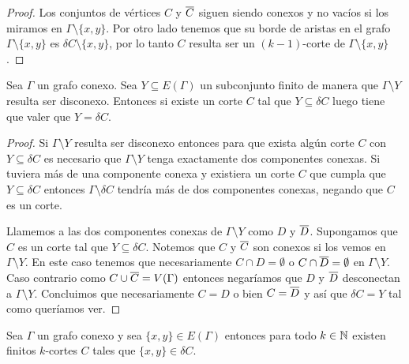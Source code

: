 \documentclass[tesis.tex]{subfiles}
\begin{document}
\begin{proof}
	Los conjuntos de vértices $C$ y $\overline C$ siguen siendo conexos y no vacíos si los miramos en $\Gamma \setminus \{ x,y \}$.
	Por otro lado tenemos que su borde de aristas en el grafo $\Gamma \setminus \{x,y\}$ es $\delta C \setminus \{x,y\}$, por lo tanto $C$ resulta ser un $(k-1)$-corte de $\Gamma \setminus \{x,y\}$.
\end{proof}

\begin{lema}\label{lema_corte_disconexo_vertices}
	Sea $\Gamma$ un grafo conexo.
	Sea $Y \subseteq E(\Gamma)$ un subconjunto finito de manera que $\Gamma \setminus Y$ resulta ser disconexo.
	Entonces si existe un corte $C$ tal que $Y \subseteq \delta C$ luego tiene que valer que $Y = \delta C$.
\end{lema}

\begin{proof}
	Si $\Gamma \setminus Y$ resulta ser disconexo entonces para que exista algún corte $C$ con $Y \subseteq \delta C$ es necesario que $\Gamma \setminus Y$ tenga exactamente dos componentes conexas.
	Si tuviera más de una componente conexa y existiera un corte $C$ que cumpla que $Y \subseteq \delta C$ entonces $\Gamma \setminus \delta C$ tendría más de dos componentes conexas, negando que $C$ es un corte.	
	
	Llamemos a las dos componentes conexas de $\Gamma \setminus Y$ como $D$ y  $\overline D$.
	Supongamos que $C$ es un corte tal que $Y \subseteq \delta C$. 
	Notemos que $C$ y $\overline C$ son conexos si los vemos en $\Gamma \setminus Y$.
	En este caso tenemos que necesariamente $C \cap  D = \emptyset$ o $C \cap \overline D = \emptyset$ en $\Gamma \setminus Y$.
	Caso contrario como $C \cup \overline C = V(\Gamma)$ entonces negaríamos que $D$ y $\overline D$ desconectan a $\Gamma \setminus Y$.
	Concluimos que necesariamente $C = D$ o bien $C = \overline D$ y así que $\delta C = Y$ tal como queríamos ver.
	
\end{proof}

\begin{prop}\label{lema_aristas_finitos_kcortes}
	Sea $\Gamma$ un grafo conexo y sea $\{x,y\} \in E(\Gamma)$ entonces para todo $k \in \mathbb{N}$ existen finitos $k$-cortes $C$ tales que $\{x,y\} \in \delta C$.
\end{prop}
\end{document}
